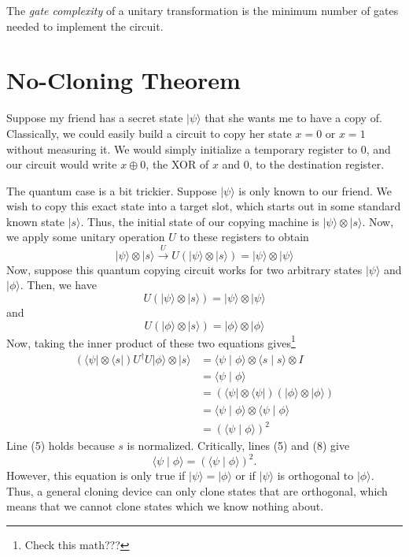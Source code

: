 \documentclass[12pt,twoside]{reedthesis}
\newcommand{\ket}[1]{\ensuremath{\lvert #1\rangle}\xspace}
\newcommand{\bra}[1]{\ensuremath{\langle #1\vert}\xspace}
\newcommand{\inner}[2]{\ensuremath{\langle #1 \mid #2 \rangle}\xspace}
\begin{document}
The \textit{gate complexity} of a unitary transformation is the minimum number of gates needed to implement the circuit. 

\section{No-Cloning Theorem}

Suppose my friend has a secret state \ket{\psi} that she wants me to have a copy of.  Classically, we could easily build a circuit to copy her state $x = 0$ or $x = 1$ without measuring it. We would simply initialize a temporary register to 0, and our circuit would write $x \oplus 0$, the XOR of $x$ and 0, to the destination register. 

The quantum case is a bit trickier. Suppose \ket{\psi} is only known to our friend. We wish to copy this exact state into a target slot, which starts out in some standard known state \ket{s}. Thus, the initial state of our copying machine is $\ket{\psi} \otimes \ket{s}$. Now, we apply some unitary operation $U$ to these registers to obtain
\begin{equation}
\ket{\psi} \otimes \ket{s} \xrightarrow{U} U(\ket{\psi} \otimes \ket{s}) = \ket{\psi} \otimes \ket{\psi}
\end{equation}
Now, suppose this quantum copying circuit works for two arbitrary states \ket{\psi} and \ket{\phi}. Then, we have
\begin{equation}
U(\ket{\psi} \otimes \ket{s}) = \ket{\psi} \otimes \ket{\psi}
\end{equation}
and
\begin{equation}
U(\ket{\phi} \otimes \ket{s}) = \ket{\phi} \otimes \ket{\phi}
\end{equation}
Now, taking the inner product of these two equations gives\footnote{Check this math???} 
\begin{align}
(\bra{\psi} \otimes \bra{s})U^{\dagger}U \ket{\phi} \otimes \ket{s}
& = \inner{\psi}{\phi} \otimes \inner{s}{s} \otimes I \\
 & = \inner{\psi}{\phi}\\
& = (\bra{\psi}\otimes \bra{\psi})(\ket{\phi}\otimes \ket{\phi}) \\
& = \inner{\psi}{\phi} \otimes \inner{\psi}{\phi} \\
& = (\inner{\psi}{\phi})^2
\end{align}
Line (5) holds because $s$ is normalized. Critically, lines (5) and (8) give
\begin{equation*}
 \inner{\psi}{\phi} = (\inner{\psi}{\phi})^2.
\end{equation*}
However, this equation is only true if $\ket{\psi} = \ket{\phi}$ or if $\ket{\psi}$ is orthogonal to $\ket{\phi}$. Thus, a general cloning device can only clone states that are orthogonal, which means that we cannot clone states which we know nothing about. 
\end{document}
